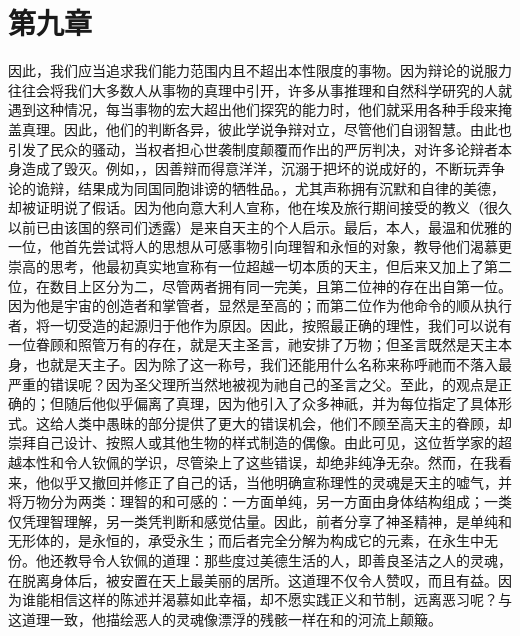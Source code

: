 
\section{第九章 }

因此，我们应当追求我们能力范围内且不超出本性限度的事物。因为辩论的说服力往往会将我们大多数人从事物的真理中引开，许多从事推理和自然科学研究的人就遇到这种情况，每当事物的宏大超出他们探究的能力时，他们就采用各种手段来掩盖真理。因此，他们的判断各异，彼此学说争辩对立，尽管他们自诩智慧。由此也引发了民众的骚动，当权者担心世袭制度颠覆而作出的严厉判决，对许多论辩者本身造成了毁灭。例如，，因善辩而得意洋洋，沉溺于把坏的说成好的，不断玩弄争论的诡辩，结果成为同国同胞诽谤的牺牲品。，尤其声称拥有沉默和自律的美德，却被证明说了假话。因为他向意大利人宣称，他在埃及旅行期间接受的教义（很久以前已由该国的祭司们透露）是来自天主的个人启示。最后，本人，最温和优雅的一位，他首先尝试将人的思想从可感事物引向理智和永恒的对象，教导他们渴慕更崇高的思考，他最初真实地宣称有一位超越一切本质的天主，但后来又加上了第二位，在数目上区分为二，尽管两者拥有同一完美，且第二位神的存在出自第一位。因为他是宇宙的创造者和掌管者，显然是至高的；而第二位作为他命令的顺从执行者，将一切受造的起源归于他作为原因。因此，按照最正确的理性，我们可以说有一位眷顾和照管万有的存在，就是天主圣言，祂安排了万物；但圣言既然是天主本身，也就是天主子。因为除了这一称号，我们还能用什么名称来称呼祂而不落入最严重的错误呢？因为圣父理所当然地被视为祂自己的圣言之父。至此，的观点是正确的；但随后他似乎偏离了真理，因为他引入了众多神祇，并为每位指定了具体形式。这给人类中愚昧的部分提供了更大的错误机会，他们不顾至高天主的眷顾，却崇拜自己设计、按照人或其他生物的样式制造的偶像。由此可见，这位哲学家的超越本性和令人钦佩的学识，尽管染上了这些错误，却绝非纯净无杂。然而，在我看来，他似乎又撤回并修正了自己的话，当他明确宣称理性的灵魂是天主的嘘气，并将万物分为两类：理智的和可感的：一方面单纯，另一方面由身体结构组成；一类仅凭理智理解，另一类凭判断和感觉估量。因此，前者分享了神圣精神，是单纯和无形体的，是永恒的，承受永生；而后者完全分解为构成它的元素，在永生中无份。他还教导令人钦佩的道理：那些度过美德生活的人，即善良圣洁之人的灵魂，在脱离身体后，被安置在天上最美丽的居所。这道理不仅令人赞叹，而且有益。因为谁能相信这样的陈述并渴慕如此幸福，却不愿实践正义和节制，远离恶习呢？与这道理一致，他描绘恶人的灵魂像漂浮的残骸一样在和的河流上颠簸。\par

